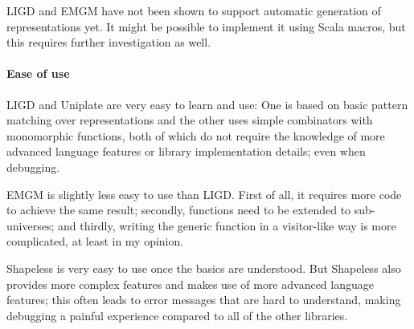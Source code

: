LIGD and EMGM have not been shown to support automatic generation of
representations yet. It might be possible to implement it using Scala
macros, but this requires further investigation as well.

\paragraph{Ease of use}
LIGD and Uniplate are very easy to learn and use: One is based on basic
pattern matching over representations and the other uses simple combinators
with monomorphic functions, both of which do not require the knowledge of
more advanced language features or library implementation details; even
when debugging.

EMGM is slightly less easy to use than LIGD. First of all, it requires more
code to achieve the same result; secondly, functions need to be extended to
sub-universes; and thirdly, writing the generic function in a visitor-like
way is more complicated, at least in my opinion.

Shapeless is very easy to use once the basics are understood. But Shapeless
also provides more complex features and makes use of more advanced language
features; this often leads to error messages that are hard to understand,
making debugging a painful experience compared to all of the other libraries.
